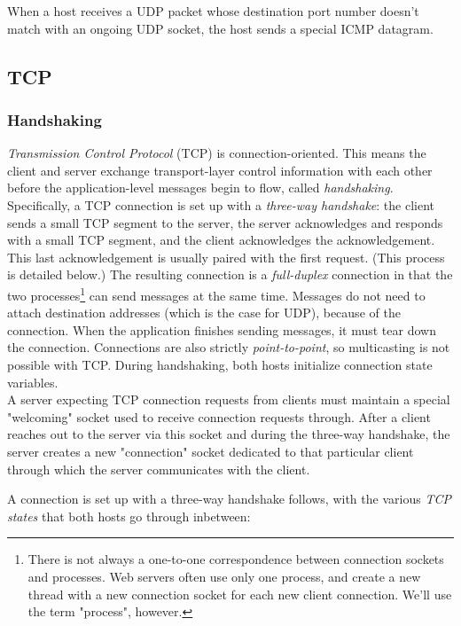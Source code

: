 \documentclass[table, xcdraw]{article}%
\begin{document}
When a host receives a UDP packet whose destination port number doesn’t match with an ongoing UDP socket, the host sends a special ICMP datagram.

\subsection{TCP} \label{ch:transport:tcp}

\subsubsection{Handshaking}

\emph{Transmission Control Protocol} (TCP) is connection-oriented. This means the client and server exchange transport-layer control information with each other before the application-level messages begin to flow, called \emph{handshaking}. Specifically, a TCP connection is set up with a \emph{three-way handshake}: the client sends a small TCP segment to the server, the server acknowledges and responds with a small TCP segment, and the client acknowledges the acknowledgement. This last acknowledgement is usually paired with the first request. (This process is detailed below.) The resulting connection is a \emph{full-duplex} connection in that the two processes\footnote{There is not always a one-to-one correspondence between connection sockets and processes. Web servers often use only one process, and create a new thread with a new connection socket for each new client connection. We'll use the term "process", however.} can send messages at the same time. Messages do not need to attach destination addresses (which is the case for UDP), because of the connection. When the application finishes sending messages, it must tear down the connection. Connections are also strictly \emph{point-to-point}, so multicasting is not possible with TCP. During handshaking, both hosts initialize connection state variables.\\
A server expecting TCP connection requests from clients must maintain a special "welcoming" socket used to receive connection requests through. After a client reaches out to the server via this socket and during the three-way handshake, the server creates a new "connection" socket dedicated to that particular client through which the server communicates with the client.

A connection is set up with a three-way handshake follows, with the various \emph{TCP states} that both hosts go through inbetween:
\end{document}
